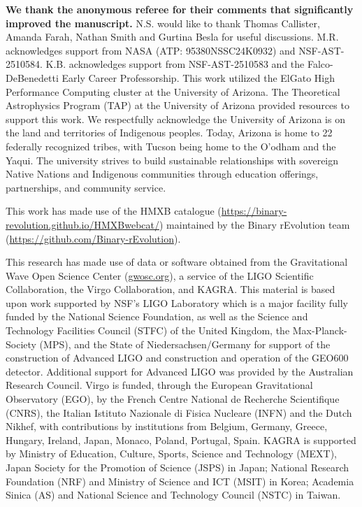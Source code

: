 \documentclass[linenumbers,trackchanges,twocolumn]{aastex701}
\begin{document}
\begin{acknowledgments}
\textbf{We thank the anonymous referee for their comments that significantly improved the manuscript.} N.S. would like to thank Thomas Callister, Amanda Farah, Nathan Smith and Gurtina Besla for useful discussions. M.R. acknowledges support from NASA (ATP: 95380NSSC24K0932) and NSF-AST-2510584. K.B. acknowledges support from NSF-AST-2510583 and the Falco-DeBenedetti Early Career Professorship. This work utilized the ElGato High Performance Computing cluster at the University of Arizona. The Theoretical Astrophysics Program (TAP) at the University of
Arizona provided resources to support this work. We respectfully acknowledge the University of Arizona is on the land and territories of Indigenous peoples. Today, Arizona is home to 22 federally recognized tribes, with Tucson being home to the O’odham and the Yaqui. The
university strives to build sustainable relationships with sovereign Native Nations and Indigenous communities through education offerings, partnerships, and community service.

This work has made use of the HMXB catalogue (\href{https://binary-revolution.github.io/HMXBwebcat/}{https://binary-revolution.github.io/HMXBwebcat/}) maintained by the Binary rEvolution team (\href{https://github.com/Binary-rEvolution}{https://github.com/Binary-rEvolution}).

This research has made use of data or software obtained from the Gravitational Wave Open Science Center (\href{gwosc.org}{gwosc.org}), a service of the LIGO Scientific Collaboration, the Virgo Collaboration, and KAGRA. This material is based upon work supported by NSF's LIGO Laboratory which is a major facility fully funded by the National Science Foundation, as well as the Science and Technology Facilities Council (STFC) of the United Kingdom, the Max-Planck-Society (MPS), and the State of Niedersachsen/Germany for support of the construction of Advanced LIGO and construction and operation of the GEO600 detector. Additional support for Advanced LIGO was provided by the Australian Research Council. Virgo is funded, through the European Gravitational Observatory (EGO), by the French Centre National de Recherche Scientifique (CNRS), the Italian Istituto Nazionale di Fisica Nucleare (INFN) and the Dutch Nikhef, with contributions by institutions from Belgium, Germany, Greece, Hungary, Ireland, Japan, Monaco, Poland, Portugal, Spain. KAGRA is supported by Ministry of Education, Culture, Sports, Science and Technology (MEXT), Japan Society for the Promotion of Science (JSPS) in Japan; National Research Foundation (NRF) and Ministry of Science and ICT (MSIT) in Korea; Academia Sinica (AS) and National Science and Technology Council (NSTC) in Taiwan.
\end{acknowledgments}
\end{document}
